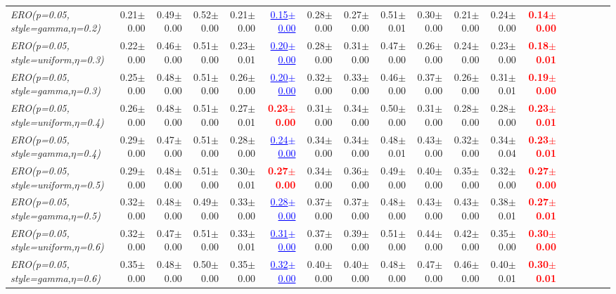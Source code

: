 \documentclass[nohyperref]{article}
\theoremstyle{plain}
\theoremstyle{definition}
\theoremstyle{remark}
\newcommand{\red}[1]{\textcolor{red}{\textbf{#1}}}
\newcommand{\blue}[1]{\textcolor{blue}{\underline{#1}}}
\begin{document}
\begin{table*}[!ht]
{\begin{tabular}{lrrrrrrrrrrrrrrrrr}
			{\it ERO(p=0.05, style=gamma,$\eta$=0.2)} & 0.21$\pm$0.00 & 0.49$\pm$0.00 & 0.52$\pm$0.00 & 0.21$\pm$0.00 & \blue{0.15$\pm$0.00} & 0.28$\pm$0.00 & 0.27$\pm$0.00 & 0.51$\pm$0.01 & 0.30$\pm$0.00 & 0.21$\pm$0.00  & 0.24$\pm$0.00 & \red{0.14$\pm$0.00} \\
			{\it ERO(p=0.05, style=uniform,$\eta$=0.3)} & 0.22$\pm$0.00 & 0.46$\pm$0.00 & 0.51$\pm$0.00 & 0.23$\pm$0.01 & \blue{0.20$\pm$0.00} & 0.28$\pm$0.00 & 0.31$\pm$0.00 & 0.47$\pm$0.00 & 0.26$\pm$0.00 & 0.24$\pm$0.00  & 0.23$\pm$0.00 & \red{0.18$\pm$0.01} \\
			{\it ERO(p=0.05, style=gamma,$\eta$=0.3)} & 0.25$\pm$0.00 & 0.48$\pm$0.00 & 0.51$\pm$0.00 & 0.26$\pm$0.00 & \blue{0.20$\pm$0.00} & 0.32$\pm$0.00 & 0.33$\pm$0.00 & 0.46$\pm$0.00 & 0.37$\pm$0.00 & 0.26$\pm$0.00  & 0.31$\pm$0.01 & \red{0.19$\pm$0.00} \\
			{\it ERO(p=0.05, style=uniform,$\eta$=0.4)} & 0.26$\pm$0.00 & 0.48$\pm$0.00 & 0.51$\pm$0.00 & 0.27$\pm$0.01 & \red{0.23$\pm$0.00} & 0.31$\pm$0.00 & 0.34$\pm$0.00 & 0.50$\pm$0.00 & 0.31$\pm$0.00 & 0.28$\pm$0.00  & 0.28$\pm$0.00 & \red{0.23$\pm$0.01} \\
			{\it ERO(p=0.05, style=gamma,$\eta$=0.4)} & 0.29$\pm$0.00 & 0.47$\pm$0.00 & 0.51$\pm$0.00 & 0.28$\pm$0.00 & \blue{0.24$\pm$0.00} & 0.34$\pm$0.00 & 0.34$\pm$0.00 & 0.48$\pm$0.01 & 0.43$\pm$0.00 & 0.32$\pm$0.00  & 0.34$\pm$0.04 & \red{0.23$\pm$0.01} \\
			{\it ERO(p=0.05, style=uniform,$\eta$=0.5)} & 0.29$\pm$0.00 & 0.48$\pm$0.00 & 0.51$\pm$0.00 & 0.30$\pm$0.01 & \red{0.27$\pm$0.00} & 0.34$\pm$0.00 & 0.36$\pm$0.00 & 0.49$\pm$0.00 & 0.40$\pm$0.00 & 0.35$\pm$0.00  & 0.32$\pm$0.00 & \red{0.27$\pm$0.00} \\
			{\it ERO(p=0.05, style=gamma,$\eta$=0.5)} & 0.32$\pm$0.00 & 0.48$\pm$0.00 & 0.49$\pm$0.00 & 0.33$\pm$0.00 & \blue{0.28$\pm$0.00} & 0.37$\pm$0.00 & 0.37$\pm$0.00 & 0.48$\pm$0.00 & 0.43$\pm$0.00 & 0.43$\pm$0.00  & 0.38$\pm$0.01 & \red{0.27$\pm$0.01} \\
			{\it ERO(p=0.05, style=uniform,$\eta$=0.6)} & 0.32$\pm$0.00 & 0.47$\pm$0.00 & 0.51$\pm$0.00 & 0.33$\pm$0.01 & \blue{0.31$\pm$0.00} & 0.37$\pm$0.00 & 0.39$\pm$0.00 & 0.51$\pm$0.00 & 0.44$\pm$0.00 & 0.42$\pm$0.00  & 0.35$\pm$0.00 & \red{0.30$\pm$0.00} \\
			{\it ERO(p=0.05, style=gamma,$\eta$=0.6)} & 0.35$\pm$0.00 & 0.48$\pm$0.00 & 0.50$\pm$0.00 & 0.35$\pm$0.00 & \blue{0.32$\pm$0.00} & 0.40$\pm$0.00 & 0.40$\pm$0.00 & 0.48$\pm$0.00 & 0.47$\pm$0.00 & 0.46$\pm$0.00  & 0.40$\pm$0.01 & \red{0.30$\pm$0.01} \\

\end{tabular}}
\end{table*}
\end{document}
